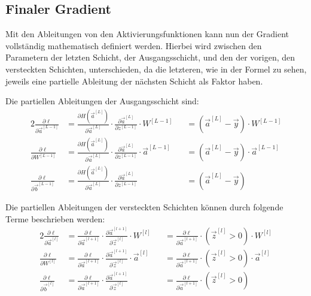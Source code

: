 \documentclass[12pt,titlepage]{article}
\begin{document}
\subsection{Finaler Gradient}

Mit den Ableitungen von den Aktivierungsfunktionen kann nun der Gradient vollständig mathematisch definiert werden. Hierbei wird zwischen den Parametern der letzten Schicht, der Ausgangsschicht, und den der vorigen, den versteckten Schichten, unterschieden, da die letzteren, wie in der Formel zu sehen, jeweils eine partielle Ableitung der nächsten Schicht als Faktor haben.

Die partiellen Ableitungen der Ausgangsschicht sind:
\begin{alignat*}{2}
  \frac{\partial \ell}{\partial \vec{a}^{[L-1]}}
   & = \frac{\partial H(\vec{a}^{[L]})}{\partial \vec{a}^{[L]}} \cdot \frac{\partial \vec{a}^{[L]}}{\partial z^{[L-1]}}  \cdot W^{[L-1]}       &  & = (\vec{a}^{[L]} - \vec{y}) \cdot W^{[L-1]}       \\
  \frac{\partial \ell}{\partial W^{[L-1]}}
   & = \frac{\partial H(\vec{a}^{[L]})}{\partial \vec{a}^{[L]}} \cdot \frac{\partial \vec{a}^{[L]}}{\partial z^{[L-1]}}  \cdot \vec{a}^{[L-1]} &  & = (\vec{a}^{[L]} - \vec{y}) \cdot \vec{a}^{[L-1]} \\
  \frac{\partial \ell}{\partial \vec{b}^{[L-1]}}
   & = \frac{\partial H(\vec{a}^{[L]})}{\partial \vec{a}^{[L]}} \cdot \frac{\partial \vec{a}^{[L]}}{\partial z^{[L-1]}}                        &  & = (\vec{a}^{[L]} - \vec{y})
\end{alignat*}

Die partiellen Ableitungen der versteckten Schichten können durch folgende Terme beschrieben werden:
\begin{alignat*}{2}
  \frac{\partial \ell}{\partial \vec{a}^{[l]}}
   & = \frac{\partial \ell}{\partial \vec{a}^{[l+1]}} \cdot \frac{\partial \vec{a}^{[l+1]}}{\partial \vec{z}^{[l]}} \cdot W^{[l]}       &  & = \frac{\partial \ell}{\partial \vec{a}^{[l+1]}} \cdot (\vec{z}^{[l]} > 0) \cdot W^{[l]}       \\
  \frac{\partial \ell}{\partial W^{[l]}}
   & = \frac{\partial \ell}{\partial \vec{a}^{[l+1]}} \cdot \frac{\partial \vec{a}^{[l+1]}}{\partial \vec{z}^{[l]}} \cdot \vec{a}^{[l]} &  & = \frac{\partial \ell}{\partial \vec{a}^{[l+1]}} \cdot (\vec{z}^{[l]} > 0) \cdot \vec{a}^{[l]} \\
  \frac{\partial \ell}{\partial \vec{b}^{[l]}}
   & = \frac{\partial \ell}{\partial \vec{a}^{[l+1]}} \cdot \frac{\partial \vec{a}^{[l+1]}}{\partial \vec{z}^{[l]}}                     &  & = \frac{\partial \ell}{\partial \vec{a}^{[l+1]}} \cdot (\vec{z}^{[l]} > 0)
\end{alignat*}
\end{document}
